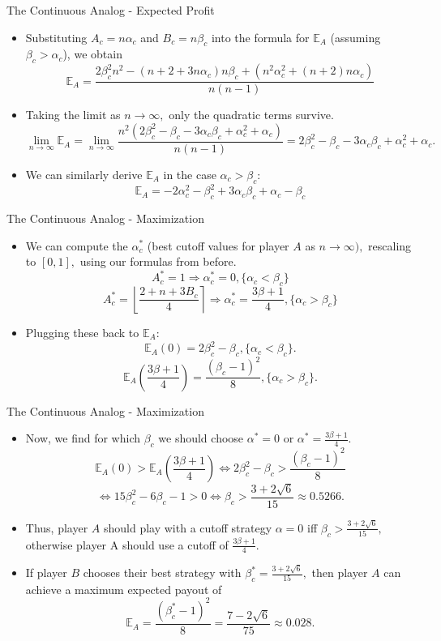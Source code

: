 \documentclass[aspectratio=169]{beamer}
\begin{document}
\begin{frame}{The Continuous Analog - Expected Profit}
\begin{itemize}
    \item Substituting \( A_c = n\alpha_c \) and \( B_c = n\beta_c \) into the formula for $\mathbb{E}_A$ (assuming $\beta_c > \alpha_c$), we obtain
\[
\mathbb{E}_A = \frac{2\beta_c^2 n^2 - (n+2+3n\alpha_c)n\beta_c + (n^2\alpha_c^2 + (n+2)n\alpha_c)}{n(n-1)}
\] \pause
\item Taking the limit as $n \to \infty,$ only the quadratic terms survive. 
 \[
\lim_{n \to \infty} \mathbb{E}_A = \lim_{n \to \infty} \frac{n^2(2\beta_c^2 - \beta_c - 3\alpha_c\beta_c + \alpha_c^2 + \alpha_c)}{n(n-1)} = 2\beta_c^{2}-\beta_c-3\alpha_c\beta_c+\alpha_c^{2}+\alpha_c.
\] \pause
\item We can similarly derive $\mathbb{E}_A$ in the case $\alpha_c > \beta_c$: $$\mathbb{E}_A = -2\alpha_c ^2 -\beta_c ^2 + 3\alpha_c\beta_c + \alpha_c - \beta_c$$
\end{itemize}
\end{frame}
\begin{frame}{The Continuous Analog - Maximization}
\pause
\begin{itemize}
    \item We can compute the $\alpha_c^{*}$ (best cutoff values for player $A$ as $n \to \infty),$ rescaling to $[0,1],$ using our formulas from before. \pause
    $$A^{*}_c = 1 \Longrightarrow \alpha^{*}_c=0, \{\alpha_c < \beta_c\}$$ \pause
    $$A^{*}_c = \left \lfloor \frac{2+n+3B_c}{4} \right \rceil \Longrightarrow \alpha^{*}_c = \frac{3\beta+1}{4}, \{\alpha_c > \beta_c\}$$ \pause
    \item Plugging these back to $\mathbb{E}_A$: \pause$$\mathbb{E}_A(0) =2\beta_c^{2}-\beta_c,\{\alpha_c < \beta_c\}.$$ \pause
 $$\mathbb{E}_A\left(\frac{3\beta+1}{4}\right)  = \frac{(\beta_c - 1)^2}{8},\{\alpha_c > \beta_c\}.$$
\end{itemize}
\end{frame}
\begin{frame}{The Continuous Analog - Maximization}
\begin{itemize}
    \item Now, we find for which $\beta_c$ we should choose $\alpha^{*}=0$ or $\alpha^{*}=\frac{3\beta+1}{4}.$ \pause $$\mathbb{E}_A(0) > \mathbb{E}_A\left(\frac{3\beta+1}{4}\right) \Longleftrightarrow 2\beta_c^{2}-\beta_c > \frac{(\beta_c-1)^{2}}{8}$$\pause $$\Longleftrightarrow 15\beta_c^{2}-6\beta_c-1>0 \Longleftrightarrow \beta_c >\frac{3+2\sqrt{6}}{15} \approx 0.5266.$$ \pause
    \item Thus, player $A$ should play with a cutoff strategy $\alpha = 0$ iff $\beta_c > \frac{3+2\sqrt{6}}{15},$ otherwise player A should use a cutoff of $\frac{3\beta+1}{4}.$ \pause
    \item If player $B$ chooses their best strategy with $\beta_c^{*} = \frac{3+2\sqrt{6}}{15},$ then player $A$ can achieve a maximum expected payout of $$\mathbb{E}_A = \frac{(\beta_c^{*}-1)^2}{8} = \frac{7-2\sqrt{6}}{75} \approx 0.028.$$ 
\end{itemize}
\end{frame}
\end{document}
